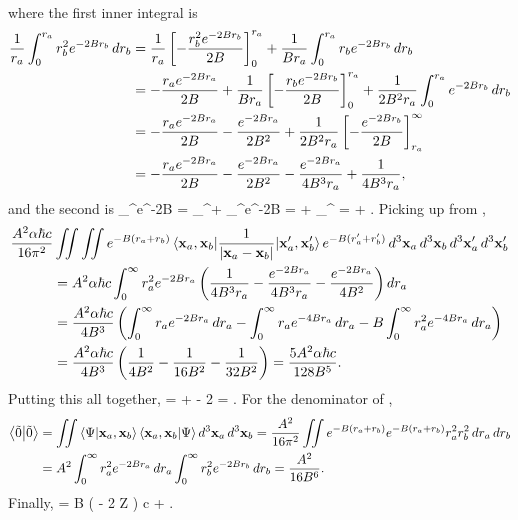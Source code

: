 \begin{solution}
\begin{align}
	\end{align}
	where the first inner integral is
	\begin{align*}
		\frac{1}{r_a} \int_0^{r_a} r_b^2 e^{-2B r_b} \dd{r_b} &= \frac{1}{r_a} \left[ -\frac{r_b^2 e^{-2 B r_b}}{2 B} \right]_0^{r_a} + \frac{1}{B r_a} \int_0^{r_a} r_b e^{-2B r_b} \dd{r_b} \\
		&= -\frac{r_a e^{-2B r_a}}{2 B} + \frac{1}{B r_a} \left[ -\frac{r_b e^{-2B r_b}}{2 B} \right]_0^{r_a} + \frac{1}{2 B^2 r_a} \int_0^{r_a} e^{-2B r_b} \dd{r_b} \\
		&= -\frac{r_a e^{-2B r_a}}{2 B} - \frac{e^{-2B r_a}}{2 B^2} + \frac{1}{2 B^2 r_a} \left[ -\frac{e^{-2B r_b}}{2B} \right]_{r_a}^\infty \\
		&= -\frac{r_a e^{-2B r_a}}{2 B} - \frac{e^{-2B r_a}}{2 B^2} - \frac{e^{-2B r_a}}{4 B^3 r_a} + \frac{1}{4 B^3 r_a},
	\end{align*}
	and the second is
	\beq
		\int_{\ra}^\infty \rb e^{-2B \rb} \drb = _{\ra}^\infty +  \int_{\ra}^\infty e^{-2B \rb} \drb
		=  +  _{\ra}^\infty
		=  + .
	\eeq
	Picking up from ,
	\begin{align*}
		\frac{A^2 \alpha \hbar c}{16\pi^2} &\iint \iint e^{-B(r_a + r_b)} \mel{\vb{x}_a, \vb{x}_b}{\frac{1}{\abs{\vb{x}_a- \vb{x}_b}}}{\vb{x}_a', \vb{x}_b'} e^{-B(r_a' + r_b')} \dd[3]{\vb{x}_a} \dd[3]{\vb{x}_b} \dd[3]{\vb{x}_a'} \dd[3]{\vb{x}_b'} \\
		&= A^2 \alpha \hbar c \int_0^\infty r_a^2 e^{-2B r_a} \left( \frac{1}{4 B^3 r_a} - \frac{e^{-2B r_a}}{4 B^3 r_a} - \frac{e^{-2B r_a}}{4 B^2} \right) \dd{r_a} \\
		&= \frac{A^2 \alpha \hbar c}{4B^3} \left( \int_0^\infty r_a e^{-2B r_a} \dd{r_a} - \int_0^\infty r_a e^{-4B r_a} \dd{r_a} - B \int_0^\infty r_a^2 e^{-4B r_a} \dd{r_a} \right) \\
		&= \frac{A^2 \alpha \hbar c}{4B^3} \left( \frac{1}{4 B^2} - \frac{1}{16 B^2} - \frac{1}{32 B^2} \right)
		= \frac{5 A^2 \alpha \hbar c}{128 B^5}.
	\end{align*}
	Putting this all together,
	\beq
		 =   +  - 2 
		=  .
	\eeq
	For the denominator of ,
	\begin{align*}
		\braket{\tilde{0}} &= \iint \braket{\Psi}{\vb{x}_a, \vb{x}_b} \braket{\vb{x}_a, \vb{x}_b}{\Psi} \dd[3]{\vb{x}_a} \dd[3]{\vb{x}_b}
		= \frac{A^2}{16 \pi^2} \iint e^{-B(r_a + r_b)} e^{-B(r_a + r_b)} r_a^2 r_b^2 \dd{r_a} \dd{r_b} \\
		&= A^2 \int_0^\infty r_a^2 e^{-2B r_a} \dd{r_a} \int_0^\infty r_b^2 e^{-2B r_b} \dd{r_b}
		= \frac{A^2}{16 B^6}.
	\end{align*}
	Finally,
	\beqn \label{Hsol}
		\Hbar = B \left(  - 2 Z \right) \alp \hbar c + .
	\eeqn
\end{solution}
\vfix



